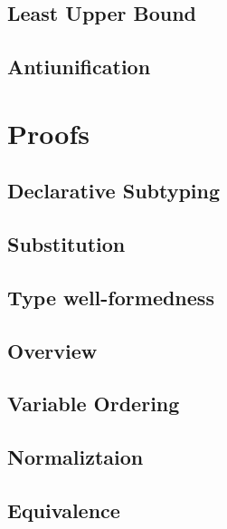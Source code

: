 \documentclass[a4,natbib=false]{article}
\begin{document}
\subsection{Least Upper Bound}
\ottdefnsLUB

\subsection{Antiunification}
\ottdefnsAU

\section{Proofs}

\subsection{Declarative Subtyping}


\subsection{Substitution}


\subsection{Type well-formedness}


\subsection{Overview}


\subsection{Variable Ordering}


\subsection{Normaliztaion}


\subsection{Equivalence}

\end{document}
